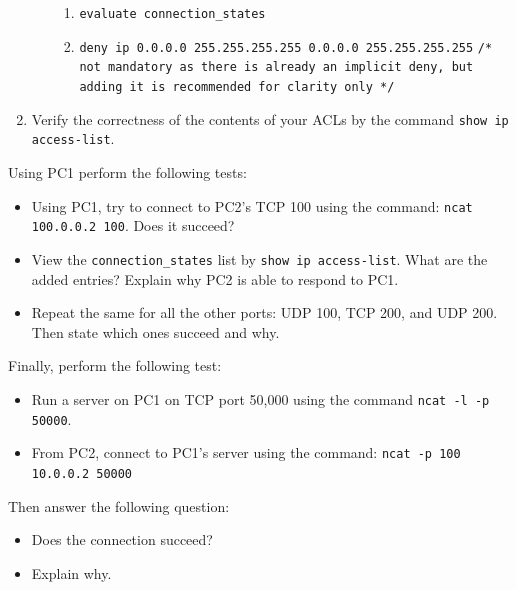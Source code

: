 \documentclass[pdftex,12pt,a4paper]{article}
\begin{document}
\begin{enumerate}
\begin{enumerate}
                            \begin{enumerate}
                                \item  \texttt{evaluate connection\_states}
                                \item  \texttt{deny ip 0.0.0.0 255.255.255.255
                                    0.0.0.0 255.255.255.255}
                                    {\color{gray}\texttt{/* not mandatory as
                                    there is already an implicit deny, but
                                    adding it is recommended for clarity only */}}
                            \end{enumerate}
                    \end{enumerate}
                \item Verify the correctness of the contents of your ACLs by the
                    command \texttt{show ip access-list}.
            \end{enumerate}


            Using PC1 perform the following tests:
            \begin{itemize}
                \item Using PC1, try to connect to PC2's TCP 100 using the
                    command: \texttt{ncat 100.0.0.2 100}. Does it succeed?
                \item View the \texttt{connection\_states} list by \texttt{show
                    ip access-list}. What are the added entries? Explain why
                    PC2 is able to respond to PC1.
                \item Repeat the same for all the other ports: UDP 100, TCP
                    200, and UDP 200. Then state which ones succeed and why.
            \end{itemize}
            
            Finally, perform the following test:
            \begin{itemize}
                \item Run a server on PC1 on TCP port 50,000 using the command
                    \texttt{ncat -l -p 50000}.
                \item From PC2, connect to PC1's server using the command:
                    \texttt{ncat -p 100 10.0.0.2 50000}
            \end{itemize}

            Then answer the following question:
            \begin{itemize}
                \item Does the connection succeed?
                \item Explain why.
            \end{itemize}
\end{document}
